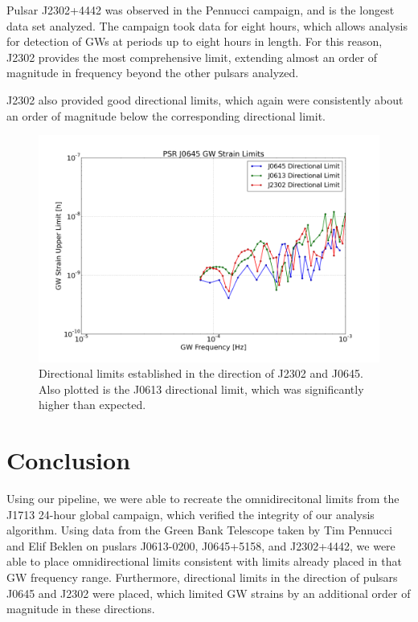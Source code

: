 \documentclass[12pt]{article}
\begin{document}
Pulsar J2302+4442 was observed in the Pennucci campaign, and is the longest data
set analyzed. The campaign took data for eight hours, which allows analysis for
detection of GWs at periods up to eight hours in length. For this reason, J2302
provides the most comprehensive limit, extending almost an order of magnitude in
frequency beyond the other pulsars analyzed.

J2302 also provided good directional limits, which again were consistently about
an order of magnitude below the corresponding directional limit.

\begin{figure}
    \caption{Directional limits established in the direction of J2302 and J0645.
    Also plotted is the J0613 directional limit, which was significantly higher
    than expected.}
    \includegraphics[width=1\textwidth]{./figures/all_directional.png}
\end{figure}

\section{Conclusion}
    Using our pipeline, we were able to recreate the omnidirecitonal limits from the J1713 24-hour global campaign, which verified the
integrity of our analysis algorithm. Using data from the Green Bank Telescope
taken by Tim Pennucci and Elif Beklen on puslars J0613-0200, J0645+5158, and
J2302+4442, we
were able to place omnidirectional limits consistent with limits already placed
in that GW frequency range. 
    Furthermore, directional limits in the direction of pulsars J0645 and J2302
    were placed, which limited GW strains by an additional order of magnitude in
    these directions.
\end{document}
